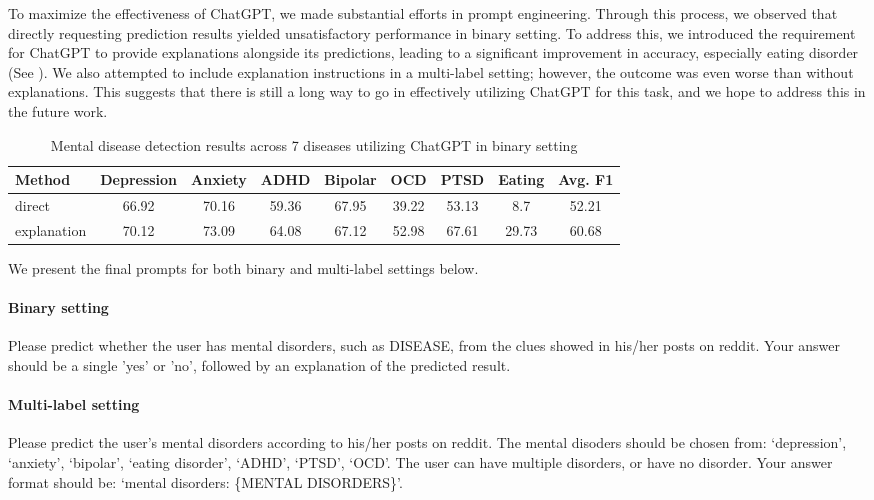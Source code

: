 To maximize the effectiveness of ChatGPT, we made substantial efforts in prompt engineering. Through this process, we observed that directly requesting prediction results yielded unsatisfactory performance in binary setting. To address this, we introduced the requirement for ChatGPT to provide explanations alongside its predictions, leading to a significant improvement in accuracy, especially eating disorder (See ). We also attempted to include explanation instructions in a multi-label setting; however, the outcome was even worse than without explanations. This suggests that there is still a long way to go in effectively utilizing ChatGPT for this task, and we hope to address this in the future work.
\begin{table}[th]
    \small
    \centering
    \begin{tabular}{l|ccccccc|c}
    \hline
    Method & Depression & Anxiety & ADHD & Bipolar & OCD & PTSD & Eating &  Avg. F1 \\ 
    \hline
     direct & 66.92&70.16&	59.36&	67.95&	39.22&	53.13&	8.7&	52.21  \\
    \hline
     explanation & 70.12	&73.09	&64.08	&67.12	&52.98	&67.61	&29.73	&60.68 \\ 
    \hline
    \end{tabular}
    \caption{Mental disease detection results across 7 diseases utilizing ChatGPT in binary setting}
    \label{tab:chatgpt}
\end{table}



We present the final prompts for both binary and multi-label settings below.
\paragraph{Binary setting} 
\begin{prompt}
    Please predict whether the user has mental disorders, such as {DISEASE}, from the clues showed in his/her posts on reddit. Your answer should be a single 'yes' or 'no', followed by an explanation of the predicted result.
\end{prompt}
\paragraph{Multi-label setting}
\begin{prompt}
Please predict the user's mental disorders according to his/her posts on reddit. The mental disoders should be chosen from: `depression', `anxiety', `bipolar', `eating disorder', `ADHD', `PTSD', `OCD'. The user can have multiple disorders, or have no disorder. Your answer format should be:  `mental disorders: \{MENTAL DISORDERS\}'.
\end{prompt}


